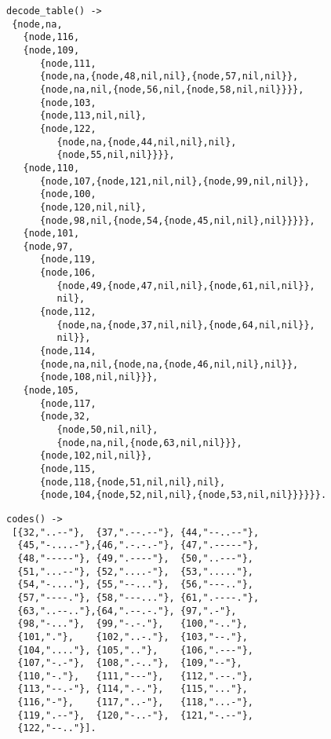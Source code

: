 \documentclass[a4paper,11pt]{article}
\begin{document}
\begin{verbatim}
decode_table() ->
 {node,na,
   {node,116,
   {node,109,
      {node,111,
      {node,na,{node,48,nil,nil},{node,57,nil,nil}},
      {node,na,nil,{node,56,nil,{node,58,nil,nil}}}},
      {node,103,
      {node,113,nil,nil},
      {node,122,
         {node,na,{node,44,nil,nil},nil},
         {node,55,nil,nil}}}},
   {node,110,
      {node,107,{node,121,nil,nil},{node,99,nil,nil}},
      {node,100,
      {node,120,nil,nil},
      {node,98,nil,{node,54,{node,45,nil,nil},nil}}}}},
   {node,101,
   {node,97,
      {node,119,
      {node,106,
         {node,49,{node,47,nil,nil},{node,61,nil,nil}},
         nil},
      {node,112,
         {node,na,{node,37,nil,nil},{node,64,nil,nil}},
         nil}},
      {node,114,
      {node,na,nil,{node,na,{node,46,nil,nil},nil}},
      {node,108,nil,nil}}},
   {node,105,
      {node,117,
      {node,32,
         {node,50,nil,nil},
         {node,na,nil,{node,63,nil,nil}}},
      {node,102,nil,nil}},
      {node,115,
      {node,118,{node,51,nil,nil},nil},
      {node,104,{node,52,nil,nil},{node,53,nil,nil}}}}}}.
\end{verbatim}

\newpage
\begin{verbatim}
codes() ->
 [{32,"..--"},  {37,".--.--"}, {44,"--..--"}, 
  {45,"-....-"},{46,".-.-.-"}, {47,".-----"}, 
  {48,"-----"}, {49,".----"},  {50,"..---"}, 
  {51,"...--"}, {52,"....-"},  {53,"....."}, 
  {54,"-...."}, {55,"--..."},  {56,"---.."},
  {57,"----."}, {58,"---..."}, {61,".----."}, 
  {63,"..--.."},{64,".--.-."}, {97,".-"}, 
  {98,"-..."},  {99,"-.-."},   {100,"-.."}, 
  {101,"."},    {102,"..-."},  {103,"--."}, 
  {104,"...."}, {105,".."},    {106,".---"}, 
  {107,"-.-"},  {108,".-.."},  {109,"--"}, 
  {110,"-."},   {111,"---"},   {112,".--."}, 
  {113,"--.-"}, {114,".-."},   {115,"..."}, 
  {116,"-"},    {117,"..-"},   {118,"...-"},
  {119,".--"},  {120,"-..-"},  {121,"-.--"}, 
  {122,"--.."}].
\end{verbatim}
\end{document}
